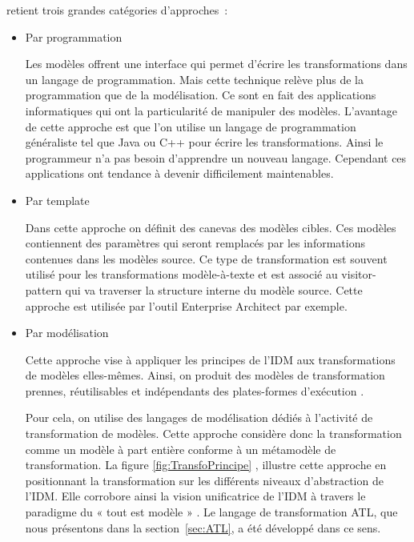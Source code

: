 \cite{blanc2011mda} retient trois grandes catégories d'approches~:

\begin{itemize}
\item Par programmation

Les modèles offrent une interface qui permet d'écrire les transformations dans 
un langage de programmation. Mais cette technique relève plus de la 
programmation que de la modélisation. Ce sont en fait des applications 
informatiques qui ont la particularité de manipuler des modèles. L'avantage de 
cette approche est que l'on utilise un langage de programmation généraliste tel 
que Java ou C++ pour écrire les transformations. Ainsi le programmeur n'a pas 
besoin d'apprendre un nouveau langage. Cependant ces applications ont tendance à 
devenir difficilement maintenables. 

\item Par template 

Dans cette approche on définit des canevas des modèles cibles. Ces modèles 
contiennent des paramètres qui seront remplacés par les informations contenues 
dans les modèles source. Ce type de transformation est souvent utilisé pour les 
transformations modèle-à-texte et est associé au visitor-pattern qui va 
traverser la structure interne du modèle source. Cette approche est utilisée par 
l'outil Enterprise Architect par exemple. 

\item Par modélisation

Cette approche vise à appliquer les principes de l'IDM aux transformations de 
modèles elles-mêmes. Ainsi, on produit des modèles de transformation prennes, 
réutilisables et indépendants des plates-formes d'exécution 
\cite{bezivin2006model}. 

Pour cela, on utilise des langages de modélisation dédiés à l'activité de 
transformation de modèles. Cette approche considère donc la transformation comme 
un modèle à part entière conforme à un métamodèle de transformation. La figure 
\ref{fig:TransfoPrincipe} , illustre cette approche en positionnant la 
transformation sur les différents niveaux d'abstraction de l'IDM. Elle corrobore 
ainsi la vision unificatrice de l'IDM à travers le paradigme du « tout est 
modèle » \cite{bezivin2005unification}. Le langage de transformation ATL, que 
nous présentons dans la section~\ref{sec:ATL}, a été développé dans ce sens. 

\end{itemize}

